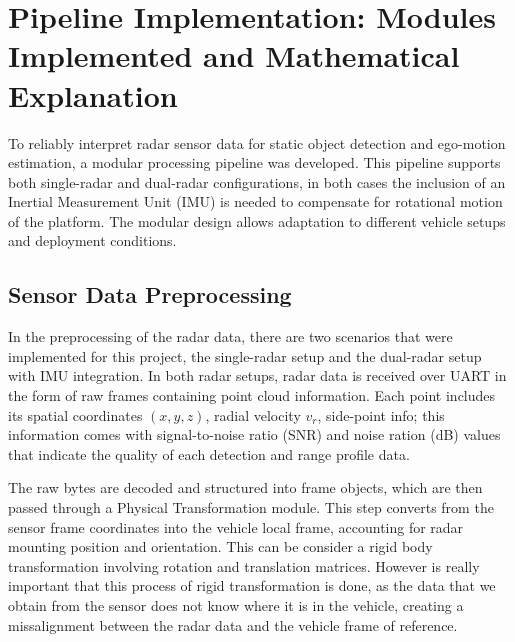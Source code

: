 
\section{Pipeline Implementation: Modules Implemented and Mathematical Explanation}
\label{sec:Mathematical Models and Algorithms for Radar-Based Object Detection}

To reliably interpret radar sensor data for static object detection and ego-motion estimation, a modular processing pipeline was developed. 
This pipeline supports both single-radar and dual-radar configurations, in both cases the inclusion of an Inertial Measurement Unit (IMU) is needed to compensate for rotational motion of the platform. 
The modular design allows adaptation to different vehicle setups and deployment conditions.

\subsection*{Sensor Data Preprocessing}
In the preprocessing of the radar data, there are two scenarios that were implemented for this project, the single-radar setup and the dual-radar setup with IMU integration.
In both radar setups, radar data is received over UART in the form of raw frames containing point cloud information. 
Each point includes its spatial coordinates $(x, y, z)$, radial velocity $v_r$, side-point info; this information comes with signal-to-noise ratio (SNR) and noise ration (dB) values that indicate the quality of each detection and range profile data.

The raw bytes are decoded \cite{understanding_uart} and structured into frame objects, which are then passed through a Physical Transformation module. 
This step converts from the sensor frame coordinates into the vehicle local frame, accounting for radar mounting position and orientation. 
This can be consider a rigid body transformation involving rotation and translation matrices.
However is really important that this process of rigid transformation is done, as the data that we obtain from the sensor does not know where it is in the vehicle, creating a missalignment between the radar data and the vehicle frame of reference.

